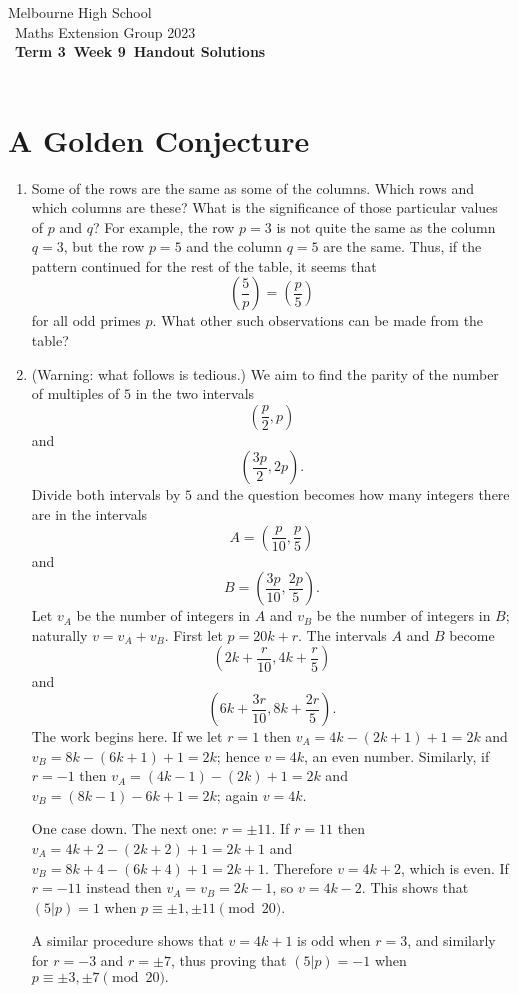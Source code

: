 \documentclass[a4paper]{article}
\title{{\thepdftitle}}
\author{Nathan Wong\and Tom Yan}
\date{2023}
\newcommand{\theterm}{3}
\newcommand{\theweek}{9}
\newcommand{\thedisplaytitle}{Term \theterm\ Week \theweek\ Handout Solutions}
\newcommand{\leg}[2]{\left(\frac{#1}{#2}\right)}
\newcommand{\ileg}[2]{(#1|#2)}
\begin{document}
\noindent Melbourne High School\\\
\noindent Maths Extension Group 2023\\\
\noindent \textbf{\thedisplaytitle}\\\
\section*{A Golden Conjecture}
\begin{enumerate}
\item Some of the rows are the same as some of
the columns. Which rows and which columns are
these? What is the significance of those particular
values of \(p\) and \(q\)?
	For example, the row \(p=3\) is not quite
		the same as the column \(q=3\), but the row
		\(p=5\) and the column \(q=5\) are the same.
		Thus, if the pattern continued for the rest of
		the table, it seems that
		\[\leg{5}{p}=\leg{p}{5}\]
		for all odd primes \(p\).
		What other such observations can be made
		from the table?
\item (Warning: what follows is tedious.)  
	We aim to find the parity of the number
	of multiples of \(5\) in the two intervals
		\[\left(\frac{p}{2},p\right)\]
		and 
		\[\left(\frac{3p}{2},2p\right).\]
	Divide both intervals by \(5\) and the question
		becomes how many integers there are in
		the intervals
		\[A=\left(\frac{p}{10},\frac{p}{5}\right)\]
		and 
		\[B=\left(\frac{3p}{10},\frac{2p}{5}\right).\]
		Let \(v_A\) be the number of integers in \(A\)
		and \(v_B\) be the number of integers in \(B\);
		naturally \(v=v_A+v_B\).
	First let \(p=20k+r\). 
		The intervals \(A\) and \(B\)
		become \[\left(2k+\frac{r}{10},4k+\frac{r}{5}\right)\]
		and 
		\[\left(6k+\frac{3r}{10},8k+\frac{2r}{5}\right).\]
		The work begins here. If we let \(r=1\)
		then \(v_A=4k-(2k+1)+1=2k\) and \(v_B=8k-(6k+1)+1=2k\); hence
		\(v=4k\), an even number.
		Similarly, if \(r=-1\) then \(v_A=(4k-1)-(2k)+1=2k\)
		and \(v_B=(8k-1)-6k+1=2k\); again \(v=4k\).

		One case down. The next one: \(r=\pm11\).
		If \(r=11\) then \(v_A=4k+2-(2k+2)+1=2k+1\)
		and \(v_B=8k+4-(6k+4)+1=2k+1\). Therefore
		\(v=4k+2\), which is even. If \(r=-11\) instead
		then \(v_A=v_B=2k-1\), so \(v=4k-2\).
		This shows that \(\ileg{5}{p}=1\) when 
		\(p\equiv\pm1,\pm11\pmod{20}.\)

		A similar procedure shows that \(v=4k+1\) is odd
		when \(r=3\), and similarly for \(r=-3\) and \(r=\pm7\),
		thus proving that \(\ileg{5}{p}=-1\) when \(p\equiv\pm3,\pm7\pmod{20}.\)


\end{enumerate}
\end{document}
